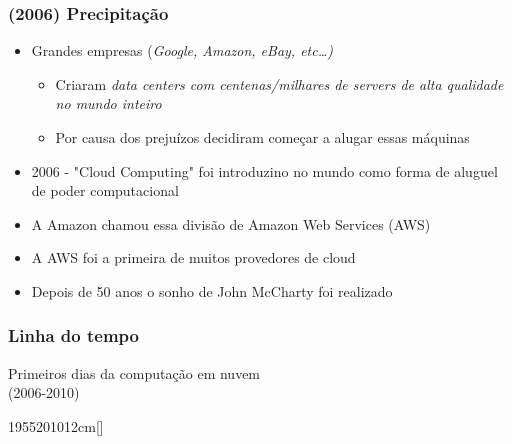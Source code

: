\begin{frame}[allowframebreaks]
	\frametitle{(2006) Precipitação}
	\begin{itemize}
		\item Grandes empresas (\it{Google, Amazon, eBay, etc\dots})
			\begin{itemize}
				\item Criaram \it{data centers} com centenas/milhares de servers de alta qualidade no mundo inteiro
				\item Por causa dos prejuízos decidiram começar a alugar essas máquinas
			\end{itemize}
		\item 2006 - "Cloud Computing" foi introduzino no mundo como forma de aluguel de poder computacional
		\item A Amazon chamou essa divisão de Amazon Web Services (AWS)
		\item A AWS foi a primeira de muitos provedores de cloud
		\item Depois de 50 anos o sonho de John McCharty foi realizado
	\end{itemize}
\end{frame}

\begin{frame}
	\frametitle{Linha do tempo}
	\begin{center}
		Primeiros dias da computação em nuvem \\
		(2006-2010)
	\end{center}
	\hfill
	\begin{scriptsize}
	\begin{bf}
	\begin{center}
		\begin{chronology}[10]{1955}{2010}{12cm}[\textwidth]
			\color{lightgreen}
		\end{chronology}
	\end{center}
	\end{bf}
	\end{scriptsize}
\end{frame}

